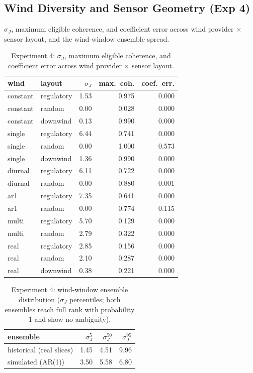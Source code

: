 \subsection{Wind Diversity and Sensor Geometry (Exp 4)}
$\sigma_J$, maximum eligible coherence, and coefficient error across wind provider
$\times$ sensor layout, and the wind-window ensemble spread.
\begin{table}[t]
\centering
\footnotesize
\caption{Experiment 4: $\sigma_J$, maximum eligible coherence, and coefficient
error across wind provider $\times$ sensor layout.}
\label{tab:results_h4}
\begin{tabular}{llrrr}
\toprule
wind & layout & $\sigma_J$ & max.\ coh. & coef.\ err. \\
\midrule
constant & regulatory & 1.53 & 0.975 & 0.000 \\
constant & random     & 0.00 & 0.028 & 0.000 \\
constant & downwind   & 0.13 & 0.990 & 0.000 \\
single   & regulatory & 6.44 & 0.741 & 0.000 \\
single   & random     & 0.00 & 1.000 & 0.573 \\
single   & downwind   & 1.36 & 0.990 & 0.000 \\
diurnal  & regulatory & 6.11 & 0.722 & 0.000 \\
diurnal  & random     & 0.00 & 0.880 & 0.001 \\
ar1      & regulatory & 7.35 & 0.641 & 0.000 \\
ar1      & random     & 0.00 & 0.774 & 0.115 \\
multi    & regulatory & 5.70 & 0.129 & 0.000 \\
multi    & random     & 2.79 & 0.322 & 0.000 \\
real     & regulatory & 2.85 & 0.156 & 0.000 \\
real     & random     & 2.10 & 0.287 & 0.000 \\
real     & downwind   & 0.38 & 0.221 & 0.000 \\
\bottomrule
\end{tabular}
\end{table}
\begin{table}[t]
\centering
\footnotesize
\caption{Experiment 4: wind-window ensemble distribution ($\sigma_J$ percentiles;
both ensembles reach full rank with probability 1 and show no ambiguity).}
\label{tab:results_h4_ens}
\begin{tabular}{lrrr}
\toprule
ensemble & $\sigma_J^{5}$ & $\sigma_J^{50}$ & $\sigma_J^{95}$ \\
\midrule
historical (real slices) & 1.45 & 4.51 & 9.96 \\
simulated (AR(1))        & 3.50 & 5.58 & 6.80 \\
\bottomrule
\end{tabular}
\end{table}

